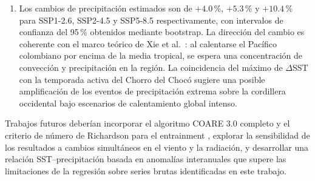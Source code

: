 \documentclass[12pt, a4paper]{article}
\begin{document}
\begin{enumerate}
	\item Los cambios de precipitaci\'on estimados son de $+4.0$\,\%, $+5.3$\,\% 
	y $+10.4$\,\% para SSP1-2.6, SSP2-4.5 y SSP5-8.5 respectivamente, con 
	intervalos de confianza del 95\,\% obtenidos mediante bootstrap. La direcci\'on 
	del cambio es coherente con el marco te\'orico de Xie et al.\ \cite{Xie2010}: 
	al calentarse el Pac\'ifico colombiano por encima de la media tropical, se 
	espera una concentraci\'on de convecci\'on y precipitaci\'on en la regi\'on. 
	La coincidencia del m\'aximo de $\Delta$SST con la temporada activa del Chorro 
	del Choc\'o \cite{Poveda2004} sugiere una posible amplificaci\'on de los eventos 
	de precipitaci\'on extrema sobre la cordillera occidental bajo escenarios de 
	calentamiento global intenso.
	
\end{enumerate}

Trabajos futuros deber\'ian incorporar el algoritmo COARE 3.0 completo 
\cite{Fairall2003} y el criterio de n\'umero de Richardson para el entrainment 
\cite{Price1986}, explorar la sensibilidad de los resultados a cambios simult\'aneos 
en el viento y la radiaci\'on, y desarrollar una relaci\'on SST--precipitaci\'on 
basada en anomal\'ias interanuales que supere las limitaciones de la regresi\'on sobre 
series brutas identificadas en este trabajo.
\end{document}
